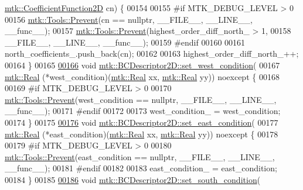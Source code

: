 \begin{DoxyCode}
      \hyperlink{group__c07-mim__ops_gad9e1c0ace886b0029aefffa5f320e852}{mtk::CoefficientFunction2D} cn) \{
00154 
00155 \textcolor{preprocessor}{  #if MTK\_DEBUG\_LEVEL > 0}
00156   \hyperlink{classmtk_1_1Tools_a332324c6f25e66be9dff48c5987a3b9f}{mtk::Tools::Prevent}(cn == \textcolor{keyword}{nullptr}, \_\_FILE\_\_, \_\_LINE\_\_, \_\_func\_\_);
00157   \hyperlink{classmtk_1_1Tools_a332324c6f25e66be9dff48c5987a3b9f}{mtk::Tools::Prevent}(highest\_order\_diff\_north\_ > 1,
00158                       \_\_FILE\_\_, \_\_LINE\_\_, \_\_func\_\_);
00159 \textcolor{preprocessor}{  #endif}
00160 
00161   north\_coefficients\_.push\_back(cn);
00162 
00163   highest\_order\_diff\_north\_++;
00164 \}
00165 
\hypertarget{mtk__bc__descriptor__2d_8cc_source_l00166}{}\hyperlink{classmtk_1_1BCDescriptor2D_a006050efe15b1be75b36a74a23051392}{00166} \textcolor{keywordtype}{void} \hyperlink{classmtk_1_1BCDescriptor2D_a006050efe15b1be75b36a74a23051392}{mtk::BCDescriptor2D::set\_west\_condition}(
00167     \hyperlink{group__c01-roots_gac080bbbf5cbb5502c9f00405f894857d}{mtk::Real} (*west\_condition)(\hyperlink{group__c01-roots_gac080bbbf5cbb5502c9f00405f894857d}{mtk::Real} xx, \hyperlink{group__c01-roots_gac080bbbf5cbb5502c9f00405f894857d}{mtk::Real} yy)) noexcept \{
00168 
00169 \textcolor{preprocessor}{  #if MTK\_DEBUG\_LEVEL > 0}
00170   \hyperlink{classmtk_1_1Tools_a332324c6f25e66be9dff48c5987a3b9f}{mtk::Tools::Prevent}(west\_condition == \textcolor{keyword}{nullptr}, \_\_FILE\_\_, \_\_LINE\_\_, \_\_func\_\_);
00171 \textcolor{preprocessor}{  #endif}
00172 
00173   west\_condition\_ = west\_condition;
00174 \}
00175 
\hypertarget{mtk__bc__descriptor__2d_8cc_source_l00176}{}\hyperlink{classmtk_1_1BCDescriptor2D_a4ba8690e845f59a1507b056f3fc8061e}{00176} \textcolor{keywordtype}{void} \hyperlink{classmtk_1_1BCDescriptor2D_a4ba8690e845f59a1507b056f3fc8061e}{mtk::BCDescriptor2D::set\_east\_condition}(
00177     \hyperlink{group__c01-roots_gac080bbbf5cbb5502c9f00405f894857d}{mtk::Real} (*east\_condition)(\hyperlink{group__c01-roots_gac080bbbf5cbb5502c9f00405f894857d}{mtk::Real} xx, \hyperlink{group__c01-roots_gac080bbbf5cbb5502c9f00405f894857d}{mtk::Real} yy)) noexcept \{
00178 
00179 \textcolor{preprocessor}{  #if MTK\_DEBUG\_LEVEL > 0}
00180   \hyperlink{classmtk_1_1Tools_a332324c6f25e66be9dff48c5987a3b9f}{mtk::Tools::Prevent}(east\_condition == \textcolor{keyword}{nullptr}, \_\_FILE\_\_, \_\_LINE\_\_, \_\_func\_\_);
00181 \textcolor{preprocessor}{  #endif}
00182 
00183   east\_condition\_ = east\_condition;
00184 \}
00185 
\hypertarget{mtk__bc__descriptor__2d_8cc_source_l00186}{}\hyperlink{classmtk_1_1BCDescriptor2D_a408f159cc44d7ee610191efb8ed48b2a}{00186} \textcolor{keywordtype}{void} \hyperlink{classmtk_1_1BCDescriptor2D_a408f159cc44d7ee610191efb8ed48b2a}{mtk::BCDescriptor2D::set\_south\_condition}(

\end{DoxyCode}
